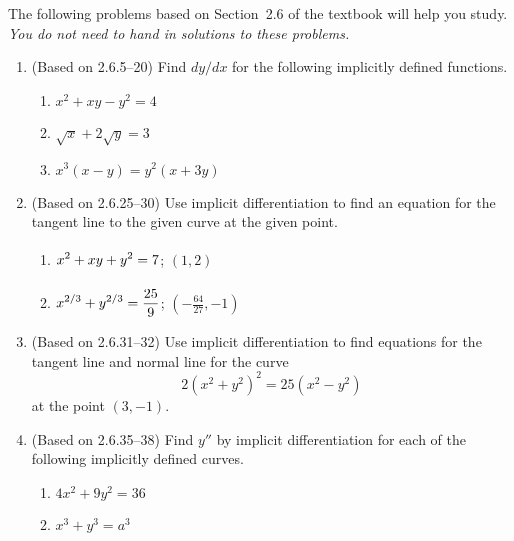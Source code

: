 \documentclass{article}
\title{\commonPSTitleZeroTwoSix}
\author{\commonAuthor}
\date{\commonDateZeroTwoSix}
\newcommand{\ds}{\displaystyle}
\begin{document}
\maketitle
\thispagestyle{empty}

\noindent
The following problems based on Section~2.6 of the textbook will help
you study.  \emph{You do not need to hand in solutions to these
  problems.}
\begin{enumerate}
\item (Based on 2.6.5--20) %
  Find $dy/dx$ for the following implicitly defined functions.
  \begin{multicols}{3}
  \begin{enumerate}
  \item $\ds x^2+xy-y^2=4$
  \item $\ds \sqrt{x}+2\sqrt{y} = 3$
  \item $\ds x^3(x-y) = y^2(x+3y)$
  \end{enumerate}
  \end{multicols}
\item (Based on 2.6.25--30) %
  Use implicit differentiation to find an equation for the tangent
  line to the given curve at the given point.
  \begin{multicols}{2}
  \begin{enumerate}
  \item $\ds \vphantom{\frac{6}{6}} x^2+xy+y^2=7$; $\ds (1,2)$
  \item $\ds \vphantom{\frac{6}{6}} x^{2/3} + y^{2/3} = \frac{25}{9}$;
    $\ds (-\frac{64}{27},-1)$
  \end{enumerate}
  \end{multicols}
\item (Based on 2.6.31--32) %
  Use implicit differentiation to find equations for the tangent line
  and normal line for the curve
  \begin{equation*}
    2(x^2+y^2)^2 = 25(x^2-y^2)
  \end{equation*}
  at the point $(3,-1)$.
\item (Based on 2.6.35--38) %
  Find $y''$ by implicit differentiation for each of the following
  implicitly defined curves.
  \begin{multicols}{2}
  \begin{enumerate}
  \item $\ds 4x^2+9y^2=36$
  \item $\ds x^3+y^3=a^3$
  \end{enumerate}

\end{multicols}
\end{enumerate}
\end{document}
